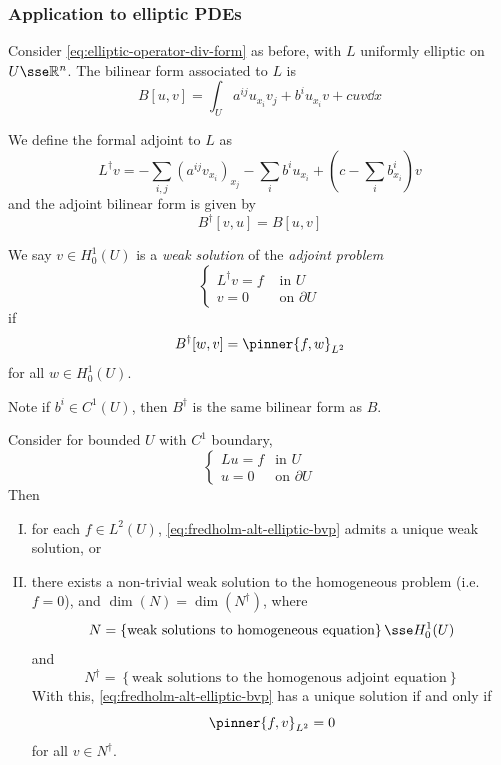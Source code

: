 \documentclass{article}
\begin{document}
\subsubsection{Application to elliptic PDEs}

Consider \cref{eq:elliptic-operator-div-form} as before, with \(L\) uniformly elliptic on \(U \sse \R^n\). The bilinear form associated to \(L\) is
\[B[u, v] = \int_U a^{ij}u_{x_i}v_j + b^iu_{x_i}v + cuv \dd x\]

\begin{definition}
    We define the formal adjoint to \(L\) as
    \[L^\dagger v = -\sum_{i,j}(a^{ij}v_{x_i})_{x_j} - \sum_i b^i u_{x_i} + \left(c - \sum_i b^i_{x_i}\right)v\]
    and the adjoint bilinear form is given by
    \[B^\dagger[v, u] = B[u, v]\]
\end{definition}

We say \(v \in H_0^1(U)\) is a \emph{weak solution} of the \emph{adjoint problem}
\[\begin{cases}
    L^\dagger v = f & \text{ in }U \\
    v = 0 & \text{ on }\partial U
\end{cases}\]
if
\[B^\dagger[w, v] = \pinner{f, w}_{L^2}\]
for all \(w \in H_0^1(U)\).

Note if \(b^i \in C^1(U)\), then \(B^\dagger\) is the same bilinear form as \(B\).

\begin{theorem}
    \label{thm:fredholm-elliptic-bvp}
    Consider for bounded \(U\) with \(C^1\) boundary,
    \begin{equation}
        \label{eq:fredholm-alt-elliptic-bvp}
        \begin{cases}
            Lu = f & \text{in }U \\
            u = 0 & \text{on }\partial U
        \end{cases}
    \end{equation}
    Then
    \begin{enumerate}[(I)]
        \item for each \(f \in L^2(U)\), \cref{eq:fredholm-alt-elliptic-bvp} admits a unique weak solution, or
        \item there exists a non-trivial weak solution to the homogeneous problem (i.e. \(f = 0\)), and \(\dim(N) = \dim(N^\dagger)\), where
        \[N = \left\{\text{weak solutions to homogeneous equation}\right\} \sse H_0^1(U)\]
        and
        \[N^\dagger = \left\{\text{weak solutions to the homogenous adjoint equation}\right\}\]
        With this, \cref{eq:fredholm-alt-elliptic-bvp} has a unique solution if and only if
        \[\pinner{f, v}_{L^2} = 0\]
        for all \(v \in N^\dagger\).
    \end{enumerate}
\end{theorem}
\end{document}
